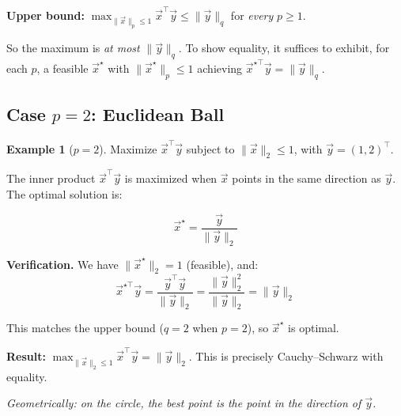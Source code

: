 \documentclass[10pt, twocolumn]{article}
\theoremstyle{definition}
\newtheorem{example}{Example}
\theoremstyle{plain}
\begin{document}
\begin{tcolorbox}[colframe=black!50]
\textbf{Upper bound:} $\displaystyle\max_{\|\vec{x}\|_p \le 1} \vec{x}^\top \vec{y} \le \|\vec{y}\|_q$ for \emph{every} $p \ge 1$.
\end{tcolorbox}

So the maximum is \emph{at most} $\|\vec{y}\|_q$. To show equality, it suffices to exhibit, for each $p$, a feasible $\vec{x}^\star$ with $\|\vec{x}^\star\|_p \le 1$ achieving $\vec{x}^{\star\top} \vec{y} = \|\vec{y}\|_q$.

\subsection{Case $p = 2$: Euclidean Ball}

\begin{example}[$p = 2$]
Maximize $\vec{x}^\top \vec{y}$ subject to $\|\vec{x}\|_2 \le 1$, with $\vec{y} = (1, 2)^\top$.
\end{example}

The inner product $\vec{x}^\top \vec{y}$ is maximized when $\vec{x}$ points in the same direction as $\vec{y}$. The optimal solution is:
\begin{result}
\[
    \vec{x}^\star = \frac{\vec{y}}{\|\vec{y}\|_2}
\]
\end{result}

\textbf{Verification.} We have $\|\vec{x}^\star\|_2 = 1$ (feasible), and:
\[
    \vec{x}^{\star\top} \vec{y} = \frac{\vec{y}^\top \vec{y}}{\|\vec{y}\|_2} = \frac{\|\vec{y}\|_2^2}{\|\vec{y}\|_2} = \|\vec{y}\|_2
\]

This matches the upper bound ($q = 2$ when $p = 2$), so $\vec{x}^\star$ is optimal.

\begin{tcolorbox}[colframe=black!50]
\textbf{Result:} $\displaystyle\max_{\|\vec{x}\|_2 \le 1} \vec{x}^\top \vec{y} = \|\vec{y}\|_2$. This is precisely Cauchy--Schwarz with equality.
\end{tcolorbox}

\textit{Geometrically: on the circle, the best point is the point in the direction of $\vec{y}$.}
\end{document}
